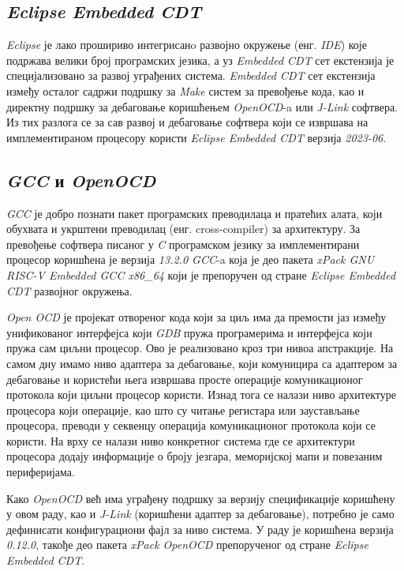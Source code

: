 \subsection{\textit{Eclipse Embedded CDT}}

\textit{Eclipse} је лако прошириво интегрисанo развојно окружење (енг. \textit{\acrfull{IDE}}) које подржава велики број програмских језика, а уз \textit{Embedded \acrfull{CDT}} \cite{embcdt} сет екстензија је специјализовано за развој уграђених система. \textit{Embedded \acrshort{CDT}} сет екстензија између осталог садржи подршку за \textit{Make} систем за превођење кода, као и директну подршку за дебаговање коришћењем \textit{OpenOCD}-a или \textit{J-Link} софтвера.
Из тих разлога се за сав развој и дебаговање софтвера који се извршава на имплементираном процесору користи \textit{Eclipse Embedded CDT} верзија \textit{2023-06}.

\subsection{\textit{GCC} и \textit{OpenOCD}}

\textit{\acrfull{GCC}} \cite{gcc} је добро познати пакет програмских преводилаца и пратећих алата, који обухвата и укрштени преводилац (енг. cross-compiler) за  архитектуру.
За превођење софтвера писаног у \textit{C} програмском језику за имплементирани процесор коришћена је верзија \textit{13.2.0 \acrshort{GCC}}-a која је део пакета \textit{xPack GNU RISC-V Embedded GCC x86\_64} који је препоручен од стране \textit{Eclipse Embedded CDT} развојног окружења.

\textit{Open \acrfull{OCD}} \cite{openocd} је пројекат отвореног кода који за циљ има да премости јаз између унификованог интерфејса који \textit{\acrfull{GDB}} пружа програмерима и интерфејса који пружа сам циљни процесор.
Ово је реализовано кроз три нивоа апстракције. На самом дну имамо ниво адаптера за дебаговање, који комуницира са адаптером за дебаговање и користећи њега извршава просте операције комуникационог протокола који циљни процесор користи. Изнад тога се налази ниво архитектуре процесора који операције, као што су читање регистара или заустављање процесора, преводи у секвенцу операција комуникационог протокола који се користи. На врху се налази ниво конкретног система где се архитектури процесора додају информације о броју језгара, меморијској мапи и повезаним периферијама.

Како \textit{Open\acrshort{OCD}} већ има уграђену подршку за верзију спецификације \cite{debug_spec} коришћену у овом раду, као и \textit{J-Link} (коришћени адаптер за дебаговање), потребно је само дефинисати конфигурациони фајл за ниво система. У раду је коришћена верзија \textit{0.12.0}, такође део пакета \textit{xPack OpenOCD} препорученог од стране \textit{Eclipse Embedded CDT}.

